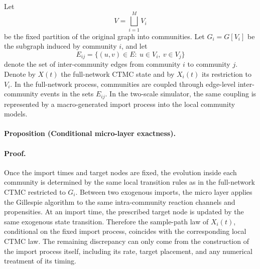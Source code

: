 \documentclass[12pt,a4paper]{article}
\begin{document}
Let
\[
V=\bigsqcup_{i=1}^{M}V_i
\]
be the fixed partition of the original graph into communities. Let \(G_i=G[V_i]\) be the subgraph induced by community \(i\), and let
\[
E_{ij}=\{(u,v)\in E:\ u\in V_i,\ v\in V_j\}
\]
denote the set of inter-community edges from community \(i\) to community \(j\). Denote by \(X(t)\) the full-network CTMC state and by \(X_i(t)\) its restriction to \(V_i\). In the full-network process, communities are coupled through edge-level inter-community events in the sets \(E_{ij}\). In the two-scale simulator, the same coupling is represented by a macro-generated import process into the local community models.

\paragraph{Proposition (Conditional micro-layer exactness).}

\paragraph{Proof.}
Once the import times and target nodes are fixed, the evolution inside each community is determined by the same local transition rules as in the full-network CTMC restricted to \(G_i\). Between two exogenous imports, the micro layer applies the Gillespie algorithm to the same intra-community reaction channels and propensities. At an import time, the prescribed target node is updated by the same exogenous state transition. Therefore the sample-path law of \(X_i(t)\), conditional on the fixed import process, coincides with the corresponding local CTMC law. The remaining discrepancy can only come from the construction of the import process itself, including its rate, target placement, and any numerical treatment of its timing.
\end{document}

